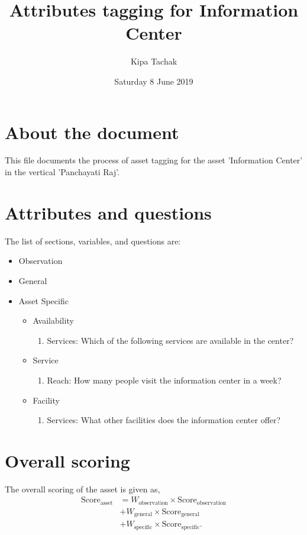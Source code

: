 \documentclass[oneside,twocolumn]{article}
\title{Attributes tagging for Information Center}
\author{Kipa Tachak}
\date{Saturday  8 June 2019}
\newcommand{\tsub}[2]{\text{#1}_{\text{#2}}}
\newcommand{\tsubb}[2]{#1_{\text{#2}}}
\begin{document}
\maketitle

\section{About the document}
This file documents the process of asset tagging for the asset 'Information Center' in the vertical 'Panchayati Raj'.

\section{Attributes and questions}
The list of sections, variables, and questions are:
\begin{itemize}
	\item Observation
	\item General
	\item Asset Specific
		\begin{itemize}
			\item Availability
				\begin{enumerate}
					\item Services:  Which of the following services are available in the center?
				\end{enumerate}
			\item Service
				\begin{enumerate}
					\item Reach: How many people visit the information center in a week?
				\end{enumerate}
			\item Facility
				\begin{enumerate}
					\item Services: What other facilities does the information center offer?
				\end{enumerate}
		\end{itemize}
\end{itemize}

\section{Overall scoring}
The overall scoring of the asset is given as,
\begin{align*}
	\tsub{Score}{asset} &= \tsubb{W}{observation} \times \tsub{Score}{observation} \\
	&+ \tsubb{W}{general} \times \tsub{Score}{general} \\
	&+ \tsubb{W}{specific} \times \tsub{Score}{specific}.
\end{align*}
\end{document}
